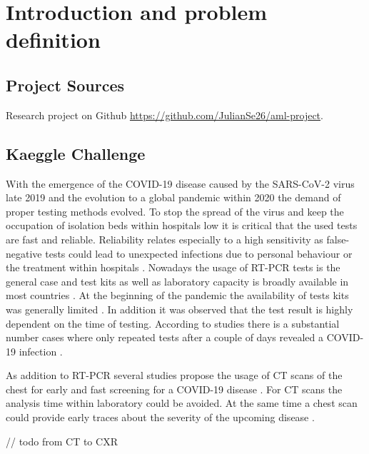 

\chapter{Introduction and problem definition}\label{chapter:intro}

\section*{Project Sources}
Research project on Github \url{https://github.com/JulianSe26/aml-project}.

\section{Kaeggle Challenge}
With the emergence of the COVID-19 disease caused by the SARS-CoV-2 virus late 2019 \autocite{huang2020clinical} and the evolution to a global pandemic within 2020 the demand of proper testing methods evolved. To stop the spread of the virus and keep the occupation of isolation beds within hospitals low it is critical that the used tests are fast and reliable. Reliability relates especially to a high sensitivity as false-negative tests could lead to unexpected infections due to personal behaviour or the treatment within hospitals \autocite{west2020covid}. Nowadays the usage of \ac{RT-PCR} tests is the general case and test kits as well as laboratory capacity is broadly available in most countries \autocite{vankasteren2020104412}. At the beginning of the pandemic the availability of tests kits was generally limited \autocite{Tannem1090}. In addition it was observed that the test result is highly dependent on the time of testing. According to studies there is a substantial number cases where only repeated tests after a couple of days revealed a COVID-19 infection \autocite{arevalo2020false}.

As addition to \ac{RT-PCR} several studies propose the usage of \ac{CT} scans of the chest for early and fast screening for a COVID-19 disease \autocite{fang2020sensitivity,xie2020chest}. For \ac{CT} scans the analysis time within laboratory could be avoided. At the same time a chest scan could provide early traces about the severity of the upcoming disease \autocite{yasin2020chest}. 

// todo from CT to CXR


